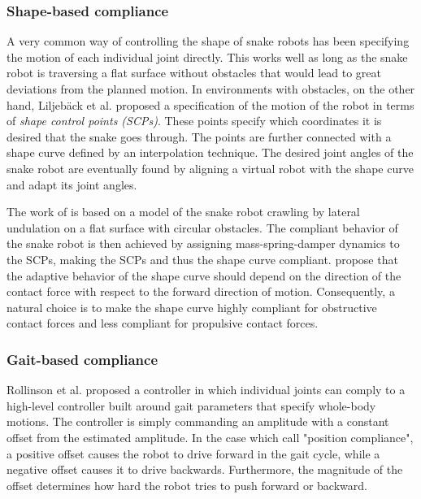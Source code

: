 \subsubsection{Shape-based compliance}

A very common way of controlling the shape of snake robots has been specifying the motion of each individual joint directly. This works well as long as the snake robot is traversing a flat surface without obstacles that would lead to great deviations from the planned motion.
In environments with obstacles, on the other hand, Liljebäck et al. \cite{liljeback2014compliant} proposed a specification of the motion of the robot in terms of \textit{shape control points (SCPs)}. These points specify which coordinates it is desired that the snake goes through. The points are further connected with a shape curve defined by an interpolation technique. The desired joint angles of the snake robot are eventually found by aligning a virtual robot with the shape curve and adapt its joint angles.

The work of \cite{liljeback2014compliant} is based on a model of the snake robot crawling by lateral undulation on a flat surface with circular obstacles. The compliant behavior of the snake robot is then achieved by assigning mass-spring-damper dynamics to the SCPs, making the SCPs and thus the shape curve compliant. \cite{liljeback2014compliant} propose that the adaptive behavior of the shape curve should depend on the direction of the contact force with respect to the forward direction of motion. Consequently, a natural choice is to make the shape curve highly compliant for obstructive contact forces and less compliant for propulsive contact forces.

\subsubsection{Gait-based compliance}

Rollinson et al. \cite{rollinson2013gait} proposed a controller in which individual joints can comply to a high-level controller built around gait parameters that specify whole-body motions. The controller is simply commanding an amplitude with a constant offset from the estimated amplitude. In the case which \cite{rollinson2013gait} call "position compliance", a positive offset causes the robot to drive forward in the gait cycle, while a negative offset causes it to drive backwards. Furthermore, the magnitude of the offset determines how hard the robot tries to push forward or backward.

